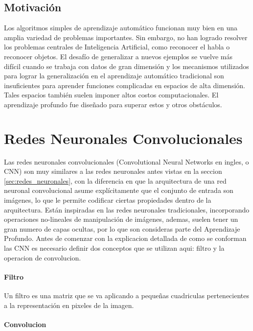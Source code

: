 \documentclass[a4paper,11pt,spanish]{book}
\begin{document}
    \subsection {Motivación}
      Los algoritmos simples de aprendizaje automático funcionan muy bien en una amplia variedad de problemas importantes.
      Sin embargo, no han logrado resolver los problemas centrales de Inteligencia Artificial, como reconocer el habla o reconocer objetos.
      El desafío de generalizar a nuevos ejemplos se vuelve más difícil cuando se trabaja con datos de gran dimensión y los mecanismos utilizados para lograr la generalización
      en el aprendizaje  automático tradicional son insuficientes para aprender funciones complicadas en espacios de alta dimensión.
      Tales espacios también suelen imponer altos costos computacionales. El aprendizaje profundo fue diseñado para superar estos y otros obstáculos.

  \section {Redes Neuronales Convolucionales}
    Las redes neuronales convolucionales (Convolutional Neural Networks en ingles, o CNN) son muy similares a las redes neuronales antes vistas en la seccion \ref{sec:redes_neuronales}, 
    con la diferencia en que la arquitectura
    de una red neuronal convolucional asume explícitamente que el conjunto de entrada son imágenes, lo que le permite codificar ciertas propiedades dentro de la arquitectura.
    Están inspiradas en las redes neuronales tradicionales, incorporando operaciones no-lineales de manipulación de imágenes, ademas, suelen tener un gran numero de capas ocultas, 
    por lo que son consideras parte del Aprendizaje Profundo.
    Antes de comenzar con la explicacion detallada de como se conforman las CNN es necesario definir dos conceptos que se utilizan aqui: filtro y  la operacion de convolucion.
    \paragraph{Filtro} Un filtro es una matriz que se va aplicando a pequeñas cuadriculas pertenecientes a la representación en pixeles de la imagen.
    \paragraph{Convolucion}
    
\end{document}
